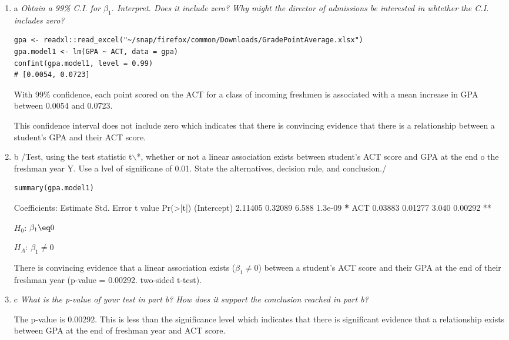 \documentclass[11pt]{article}
\begin{document}
\begin{enumerate}
\item a
\label{sec:org72f4a7a}
\emph{Obtain a 99\% C.I. for \(\beta_1\). Interpret. Does it include zero? Why might the
director of admissions be interested in whtether the C.I. includes zero?}

\begin{verbatim}
gpa <- readxl::read_excel("~/snap/firefox/common/Downloads/GradePointAverage.xlsx")
gpa.model1 <- lm(GPA ~ ACT, data = gpa)
confint(gpa.model1, level = 0.99)
# [0.0054, 0.0723]
\end{verbatim}

With 99\% confidence, each point scored on the ACT for a class of incoming
freshmen is associated with a mean increase in GPA between 0.0054 and 0.0723.

This confidence interval does not include zero which indicates that there is
convincing evidence that there is a relationship between a student's GPA and
their ACT score.
\item b
\label{sec:orgbb4a118}
/Test, using the test statistic t$\backslash$*, whether or not a linear association exists
between student's ACT score and GPA at the end o the freshman year Y. Use a lvel
of significane of 0.01. State the alternatives, decision rule, and conclusion./
\begin{verbatim}
summary(gpa.model1)
\end{verbatim}

Coefficients:
            Estimate Std. Error t value Pr(>|t|)
(Intercept)  2.11405    0.32089   6.588  1.3e-09 \textbf{*}
ACT          0.03883    0.01277   3.040  0.00292 **

\(H_0\): \(\beta_1 \eq 0\)

\(H_A\): \(\beta_1 \neq 0\)

There is convincing evidence that a linear association exists (\(\beta_1 \neq 0\)) between a
student's ACT score and their GPA at the end of their freshman year (p-value =
0.00292. two-sided t-test).
\item c
\label{sec:orgcd00731}
\emph{What is the p-value of your test in part b? How does it support the conclusion
reached in part b?}

The p-value is 0.00292. This is less than the significance level which indicates
that there is significant evidence that a relationship exists between GPA at the
end of freshman year and ACT score.
\end{enumerate}
\end{document}
